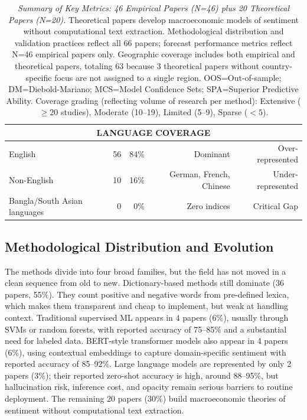\documentclass[12pt,oneside]{article}
\begin{document}
\begin{table}[htbp]
{\begin{tabular}{|l|r|r|r|r|}
\hline
\multicolumn{5}{|c|}{\textbf{LANGUAGE COVERAGE}} \\
\hline
English & 56 & 84\% & Dominant & Over-represented \\
Non-English & 10 & 16\% & German, French, Chinese & Under-represented \\
Bangla/South Asian languages & 0 & 0\% & Zero indices & Critical Gap \\
\hline
\end{tabular}
}%
\caption{\textit{Summary of Key Metrics: 46 Empirical Papers (N=46) plus 20 Theoretical Papers (N=20).} Theoretical papers develop macroeconomic models of sentiment without computational text extraction. Methodological distribution and validation practices reflect all 66 papers; forecast performance metrics reflect N=46 empirical papers only. Geographic coverage includes both empirical and theoretical papers, totaling 63 because 3 theoretical papers without country-specific focus are not assigned to a single region. OOS=Out-of-sample; DM=Diebold-Mariano; MCS=Model Confidence Sets; SPA=Superior Predictive Ability. Coverage grading (reflecting volume of research per method): Extensive ($\geq 20$ studies), Moderate (10--19), Limited (5--9), Sparse ($<5$).}
\label{tab:metasummary}
\end{table}



\subsection{Methodological Distribution and Evolution}

The methods divide into four broad families, but the field has not moved in a clean sequence from old to new. Dictionary-based methods still dominate (36 papers, 55\%). They count positive and negative words from pre-defined lexica, which makes them transparent and cheap to implement, but weak at handling context. Traditional supervised ML appears in 4 papers (6\%), usually through SVMs or random forests, with reported accuracy of 75--85\% and a substantial need for labeled data. BERT-style transformer models also appear in 4 papers (6\%), using contextual embeddings to capture domain-specific sentiment with reported accuracy of 85--92\%. Large language models are represented by only 2 papers (3\%); their reported zero-shot accuracy is high, around 88--95\%, but hallucination risk, inference cost, and opacity remain serious barriers to routine deployment. The remaining 20 papers (30\%) build macroeconomic theories of sentiment without computational text extraction.
\end{document}
